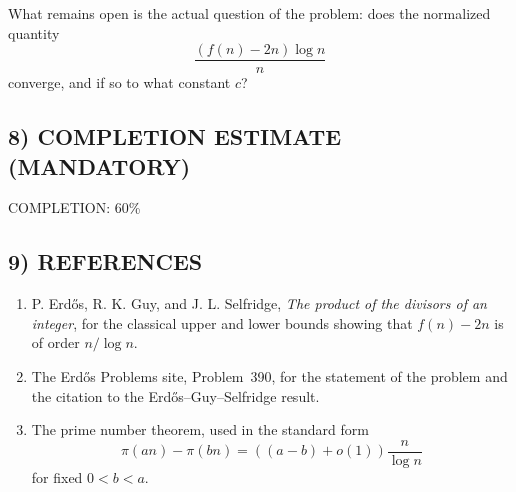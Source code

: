 What remains open is the actual question of the problem:
does the normalized quantity
\[
\frac{(f(n)-2n)\log n}{n}
\]
converge, and if so to what constant $c$?

\subsection*{8) COMPLETION ESTIMATE (MANDATORY)}

COMPLETION: 60\%

\subsection*{9) REFERENCES}

\begin{enumerate}
\item P. Erd\H{o}s, R. K. Guy, and J. L. Selfridge, \emph{The product of the divisors of an integer}, for the classical upper and lower bounds showing that $f(n)-2n$ is of order $n/\log n$.

\item The Erd\H{o}s Problems site, Problem~390, for the statement of the problem and the citation to the Erd\H{o}s--Guy--Selfridge result.

\item The prime number theorem, used in the standard form
\[
\pi(an)-\pi(bn)=\left((a-b)+o(1)\right)\frac{n}{\log n}
\]
for fixed $0<b<a$.
\end{enumerate}
